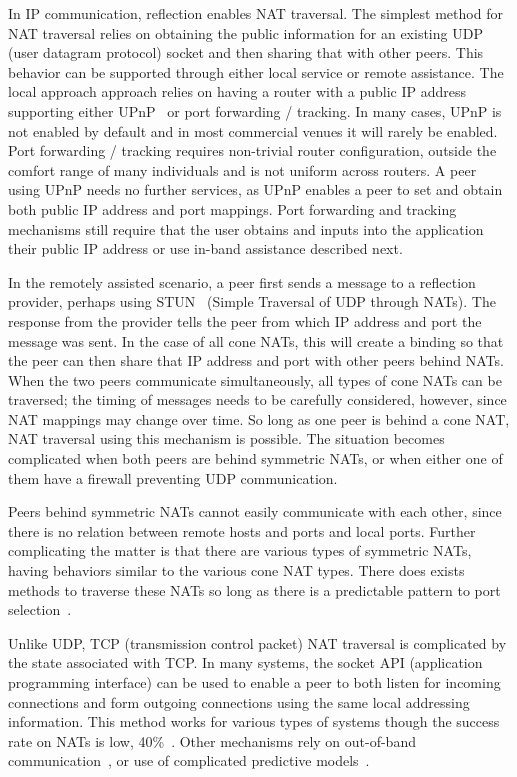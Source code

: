In IP communication, reflection enables NAT traversal.  The simplest method for
NAT traversal relies on obtaining the public information for an existing UDP
(user datagram protocol) socket and then sharing that with other peers.  This
behavior can be supported through either local service or remote assistance.
The local approach approach relies on having a router with a public IP address
supporting either UPnP~\cite{upnp} or port forwarding / tracking.  In many
cases, UPnP is not enabled by default and in most commercial venues it will
rarely be enabled.  Port forwarding / tracking requires non-trivial router
configuration, outside the comfort range of many individuals and is not uniform
across routers.  A peer using UPnP needs no further services, as UPnP enables a
peer to set and obtain both public IP address and port mappings.  Port
forwarding and tracking mechanisms still require that the user obtains and
inputs into the application their public IP address or use in-band assistance
described next.

In the remotely assisted scenario, a peer first sends a message to a reflection
provider, perhaps using STUN~\cite{stun_rfc} (Simple Traversal of UDP through
NATs).  The response from the provider tells the peer from which IP address and
port the message was sent.  In the case of all cone NATs, this will create a
binding so that the peer can then share that IP address and port with other
peers behind NATs.  When the two peers communicate simultaneously, all types of
cone NATs can be traversed; the timing of messages needs to be carefully
considered, however, since NAT mappings may change over time.  So long as one
peer is behind a cone NAT, NAT traversal using this mechanism is possible.  The
situation becomes complicated when both peers are behind symmetric NATs, or
when either one of them have a firewall preventing UDP communication.

Peers behind symmetric NATs cannot easily communicate with each other, since
there is no relation between remote hosts and ports and local ports.  Further
complicating the matter is that there are various types of symmetric NATs,
having behaviors similar to the various cone NAT types. There does exists
methods to traverse these NATs so long as there is a predictable pattern to
port selection~\cite{ice}.

Unlike UDP, TCP (transmission control packet) NAT traversal is complicated by
the state associated with TCP.  In many systems, the socket API (application
programming interface) can be used to enable a peer to both listen for incoming
connections and form outgoing connections using the same local addressing
information.  This method works for various types of systems though the success
rate on NATs is low, 40\%~\cite{ice-tcp}.  Other mechanisms rely on out-of-band
communication~\cite{pvc}, or use of complicated predictive
models~\cite{tcp-hole-punching}.

